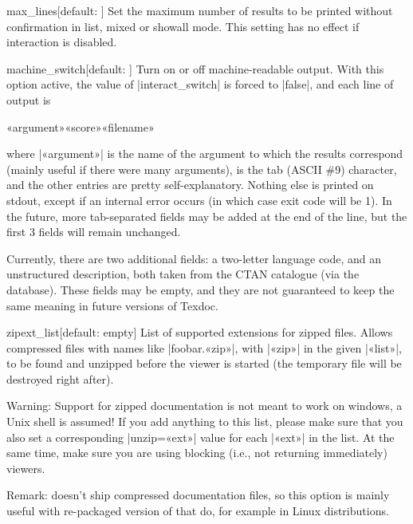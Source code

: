 \documentclass[draft]{texdoc-doc}
\begin{document}
\begin{confitem}{max\_lines}{}[default: ]
Set the maximum number of results to be printed without confirmation in list,
mixed or showall mode. This setting has no effect if interaction is disabled.
\end{confitem}

\begin{confitem}{machine\_switch}{}[default: ]
Turn on or off machine-readable output. With this option active, the value of
|interact_switch| is forced to |false|, and each line of output is
%
\begin{htcode}
«argument»\metatab«score»\metatab«filename»
\end{htcode}
%
where |«argument»| is the name of the argument to which the results correspond
(mainly useful if there were many arguments), {\metatab} is the tab (ASCII \#9)
character, and the other entries are pretty self-explanatory. Nothing else is
printed on stdout, except if an internal error occurs (in which case exit code
will be 1). In the future, more tab-separated fields may be added at the end
of the line, but the first 3 fields will remain unchanged.

Currently, there are two additional fields: a two-letter language code, and an
unstructured description, both taken from the CTAN catalogue (via the {\TL}
database). These fields may be empty, and they are not guaranteed to keep the
same meaning in future versions of Texdoc.
\end{confitem}

\begin{confitem}{zipext\_list}{}[default: empty]
List of supported extensions for zipped files. Allows compressed files with
names like |foobar.«zip»|, with |«zip»| in the given |«list»|, to be found and
unzipped before the viewer is started (the temporary file will be destroyed
right after).

Warning: Support for zipped documentation is not meant to work on windows, a
Unix shell is assumed! If you add anything to this list, please make sure that
you also set a corresponding |unzip=«ext»| value for each |«ext»| in the list.
At the same time, make sure you are using blocking (i.e., not returning
immediately) viewers.

Remark: {\TL} doesn't ship compressed documentation files, so this option is
mainly useful with re-packaged version of {\TL} that do, for example in Linux
distributions.
\end{confitem}
\end{document}
